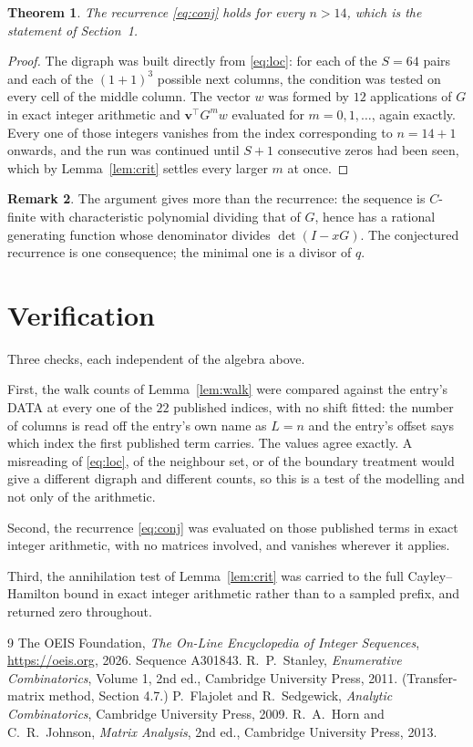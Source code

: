 \documentclass[11pt,a4paper]{article}
\theoremstyle{plain}
\newtheorem{theorem}{Theorem}
\theoremstyle{definition}
\newtheorem{remark}[theorem]{Remark}
\begin{document}
\begin{theorem}
The recurrence \eqref{eq:conj} holds for every $n>14$, which is the statement of
Section~1.
\end{theorem}

\begin{proof}
The digraph was built directly from \eqref{eq:loc}: for each of the $S=64$ pairs and each
of the $(1+1)^{3}$ possible next columns, the condition was tested on every cell of
the middle column. The vector $w$ was formed by $12$ applications of $G$ in exact integer
arithmetic and $\mathbf{v}^{\!\top}G^{m}w$ evaluated for $m=0,1,\dots$, again exactly.
Every one of those integers vanishes from the index corresponding to $n=14+1$ onwards,
and the run was continued until $S+1$ consecutive zeros had been seen, which by
Lemma~\ref{lem:crit} settles every larger $m$ at once.
\end{proof}

\begin{remark}
The argument gives more than the recurrence: the sequence is $C$-finite with characteristic
polynomial dividing that of $G$, hence has a rational generating function whose denominator
divides $\det(I-xG)$. The conjectured recurrence is one consequence; the minimal one is a
divisor of $q$.
\end{remark}

\section{Verification}

Three checks, each independent of the algebra above.

First, the walk counts of Lemma~\ref{lem:walk} were compared against the entry's DATA at
every one of the $22$ published indices, with no shift fitted: the number of columns is
read off the entry's own name as $L=n$ and the entry's offset says which index the first
published term carries. The values agree exactly. A misreading of \eqref{eq:loc}, of the
neighbour set, or of the boundary treatment would give a different digraph and different
counts, so this is a test of the modelling and not only of the arithmetic.

Second, the recurrence \eqref{eq:conj} was evaluated on those published terms in exact
integer arithmetic, with no matrices involved, and vanishes wherever it applies.

Third, the annihilation test of Lemma~\ref{lem:crit} was carried to the full
Cayley--Hamilton bound in exact integer arithmetic rather than to a sampled prefix, and
returned zero throughout.

\begin{thebibliography}{9}
 The OEIS Foundation, \emph{The On-Line Encyclopedia of Integer
Sequences}, \url{https://oeis.org}, 2026. Sequence A301843.
 R.~P.~Stanley, \emph{Enumerative Combinatorics}, Volume 1, 2nd ed.,
Cambridge University Press, 2011. (Transfer-matrix method, Section 4.7.)
 P.~Flajolet and R.~Sedgewick, \emph{Analytic Combinatorics}, Cambridge
University Press, 2009.
 R.~A.~Horn and C.~R.~Johnson, \emph{Matrix Analysis}, 2nd ed., Cambridge
University Press, 2013.
\end{thebibliography}
\end{document}
